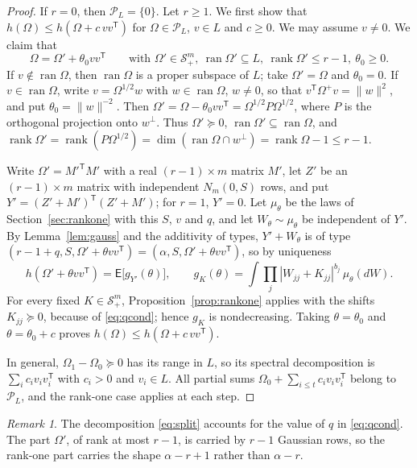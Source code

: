 \documentclass{amsart}
\theoremstyle{definition}
\theoremstyle{remark}
\newtheorem{remark}[theorem]{Remark}
\numberwithin{equation}{section}
\newcommand{\E}{\mathsf{E}}
\newcommand{\Sym}{\mathcal{S}}
\newcommand{\ran}{\operatorname{ran}}
\newcommand{\rank}{\operatorname{rank}}
\begin{document}
\begin{proof}
If $r=0$, then $\mathcal P_L=\{0\}$. Let $r\ge1$. We first show that $h(\Omega)\le h(\Omega+c\,vv^{\mathsf T})$ for $\Omega\in\mathcal P_L$, $v\in L$ and $c\ge0$. We may assume $v\ne0$. We claim that
\begin{equation}\label{eq:split}
\Omega=\Omega'+\theta_0vv^{\mathsf T}\qquad\text{with }\Omega'\in\Sym^m_+,\ \ran\Omega'\subseteq L,\ \rank\Omega'\le r-1,\ \theta_0\ge0.
\end{equation}
If $v\notin\ran\Omega$, then $\ran\Omega$ is a proper subspace of $L$; take $\Omega'=\Omega$ and $\theta_0=0$. If $v\in\ran\Omega$, write $v=\Omega^{1/2}w$ with $w\in\ran\Omega$, $w\ne0$, so that $v^{\mathsf T}\Omega^+v=\|w\|^2$, and put $\theta_0=\|w\|^{-2}$. Then $\Omega'=\Omega-\theta_0vv^{\mathsf T}=\Omega^{1/2}P\Omega^{1/2}$, where $P$ is the orthogonal projection onto $w^\perp$. Thus $\Omega'\succeq0$, $\ran\Omega'\subseteq\ran\Omega$, and $\rank\Omega'=\rank(P\Omega^{1/2})=\dim(\ran\Omega\cap w^\perp)=\rank\Omega-1\le r-1$.

Write $\Omega'=M'^{\mathsf T}M'$ with a real $(r-1)\times m$ matrix $M'$, let $Z'$ be an $(r-1)\times m$ matrix with independent $N_m(0,S)$ rows, and put $Y'=(Z'+M')^{\mathsf T}(Z'+M')$; for $r=1$, $Y'=0$. Let $\mu_\theta$ be the laws of Section~\ref{sec:rankone} with this $S$, $v$ and $q$, and let $W_\theta\sim\mu_\theta$ be independent of $Y'$. By Lemma~\ref{lem:gauss} and the additivity of types, $Y'+W_\theta$ is of type $(r-1+q,S,\Omega'+\theta vv^{\mathsf T})=(\alpha,S,\Omega'+\theta vv^{\mathsf T})$, so by uniqueness
\[
h(\Omega'+\theta vv^{\mathsf T})=\E\bigl[g_{Y'}(\theta)\bigr],\qquad g_K(\theta)=\int\prod_j|W_{jj}+K_{jj}|^{b_j}\,\mu_\theta(dW).
\]
For every fixed $K\in\Sym^m_+$, Proposition~\ref{prop:rankone} applies with the shifts $K_{jj}\succeq0$, because of \eqref{eq:qcond}; hence $g_K$ is nondecreasing. Taking $\theta=\theta_0$ and $\theta=\theta_0+c$ proves $h(\Omega)\le h(\Omega+c\,vv^{\mathsf T})$.

In general, $\Omega_1-\Omega_0\succeq0$ has its range in $L$, so its spectral decomposition is $\sum_{i}c_iv_iv_i^{\mathsf T}$ with $c_i>0$ and $v_i\in L$. All partial sums $\Omega_0+\sum_{i\le t}c_iv_iv_i^{\mathsf T}$ belong to $\mathcal P_L$, and the rank-one case applies at each step.
\end{proof}

\begin{remark}
The decomposition \eqref{eq:split} accounts for the value of $q$ in \eqref{eq:qcond}. The part $\Omega'$, of rank at most $r-1$, is carried by $r-1$ Gaussian rows, so the rank-one part carries the shape $\alpha-r+1$ rather than $\alpha-r$.
\end{remark}
\end{document}
